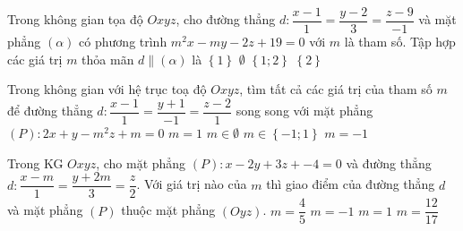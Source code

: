 \begin{ex}%
Trong không gian tọa độ $Oxyz$, cho đường thẳng $d:\dfrac{x-1}{1}=\dfrac{y-2}{3}=\dfrac{z-9}{-1}$ và mặt phẳng $(\alpha)$ có phương trình $m^2x-my-2z+19=0$ với $m$ là tham số. Tập hợp các giá trị $m$ thỏa mãn $d \parallel (\alpha)$ là
\choice
{$\left\{1\right\}$}
{$\emptyset$}
{$\left\{1;2\right\}$}
{\True $\left\{2\right\}$}
\end{ex}

\begin{ex}%
Trong không gian với hệ trục toạ độ $Oxyz$, tìm tất cả các giá trị của tham số $m$ để đường thẳng $d:\dfrac{x-1}{1}=\dfrac{y+1}{-1}=\dfrac{z-2}{1}$ song song với mặt phẳng $(P):2x+y-m^2z+m=0$
\choice
{$m=1$}
{$m\in\emptyset$}
{$m\in\left\{-1;1\right\}$}
{\True $m=-1$}
\end{ex}

\begin{ex}%
Trong KG $Oxyz$, cho mặt phẳng $(P):x-2y+3z+-4=0$ và đường thẳng $d: \dfrac{x-m}{1}=\dfrac{y+2m}{3}=\dfrac{z}{2}$. Với giá trị nào của $m$ thì giao điểm của đường thẳng $d$ và mặt phẳng $(P)$ thuộc mặt phẳng $(Oyz)$.
\choice
{$m=\dfrac{4}{5}$}
{$m=-1$}
{\True $m=1$}
{$m=\dfrac{12}{17}$}
\end{ex}

